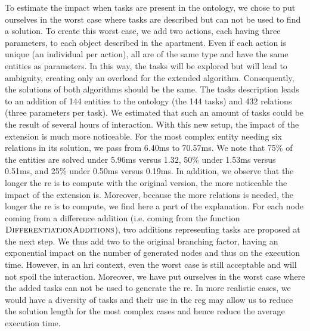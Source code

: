 To estimate the impact when tasks are present in the ontology, we chose to put ourselves in the worst case where tasks are described but can not be used to find a solution. To create this worst case, we add two actions, each having three parameters, to each object described in the apartment. Even if each action is unique (an individual per action), all are of the same type and have the same entities as parameters. In this way, the tasks will be explored but will lead to ambiguity, creating only an overload for the extended algorithm. Consequently, the solutions of both algorithms should be the same. The tasks description leads to an addition of 144 entities to the ontology (the 144 tasks) and 432 relations (three parameters per task). We estimated that such an amount of tasks could be the result of several hours of interaction. With this new setup, the impact of the extension is much more noticeable. For the most complex entity needing six relations in its solution, we pass from 6.40ms to 70.57ms. We note that 75\% of the entities are solved under 5.96ms versus 1.32, 50\% under 1.53ms versus 0.51ms, and 25\% under 0.50ms versus 0.19ms. In addition, we observe that the longer the \acrshort{re} is to compute with the original version, the more noticeable the impact of the extension is. Moreover, because the more relations is needed, the longer the \acrshort{re} is to compute, we find here a part of the explanation. For each node coming from a difference addition (i.e. coming from the function $\textsc{DifferentiationAdditions}$), two additions representing tasks are proposed at the next step. We thus add two to the original branching factor, having an exponential impact on the number of generated nodes and thus on the execution time. However, in an \acrshort{hri} context, even the worst case is still acceptable and will not spoil the interaction. Moreover, we have put ourselves in the worst case where the added tasks can not be used to generate the \acrshort{re}. In more realistic cases, we would have a diversity of tasks and their use in the \acrshort{reg} may allow us to reduce the solution length for the most complex cases and hence reduce the average execution time.




